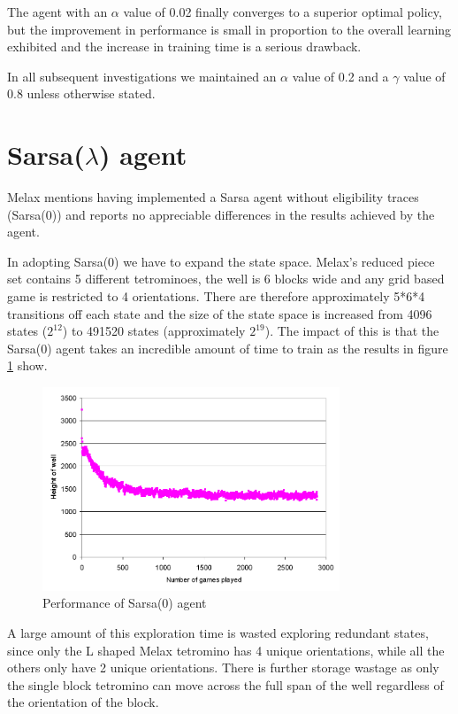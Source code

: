 \documentclass{rucsthesis}
\begin{document}
The agent with an $\alpha$ value of 0.02 finally converges to a superior optimal policy, but the improvement in performance is small in proportion to the overall learning exhibited and the increase in training time is a serious drawback.

In all subsequent investigations we maintained an $\alpha$ value of 0.2 and a $\gamma$ value of 0.8 unless otherwise stated.

\section{Sarsa($\lambda$) agent}

Melax mentions having implemented a Sarsa agent without eligibility traces (Sarsa(0)) and reports no appreciable differences in the results achieved by the agent. 

In adopting Sarsa(0) we have to expand the state space. Melax's reduced piece set contains 5 different tetrominoes, the well is 6 blocks wide and any grid based game is restricted to 4 orientations. There are therefore approximately 5*6*4 transitions off each state and the size of the state space is increased from 4096 states ($2^{12}$) to 491520 states (approximately $2^{19}$). The impact of this is that the Sarsa(0) agent takes an incredible amount of time to train as the results in figure \ref{fig:melaxsarsa} show.

\begin{figure}[h]
\centering
\includegraphics[width=3.5in]{sarsamelax.png}
\caption{Performance of Sarsa(0) agent}
\label{fig:melaxsarsa}
\end{figure} 

A large amount of this exploration time is wasted exploring redundant states, since only the L shaped Melax tetromino has 4 unique orientations, while all the others only have 2 unique orientations. There is further storage wastage as only the single block tetromino can move across the full span of the well regardless of the orientation of the block. 
\end{document}
